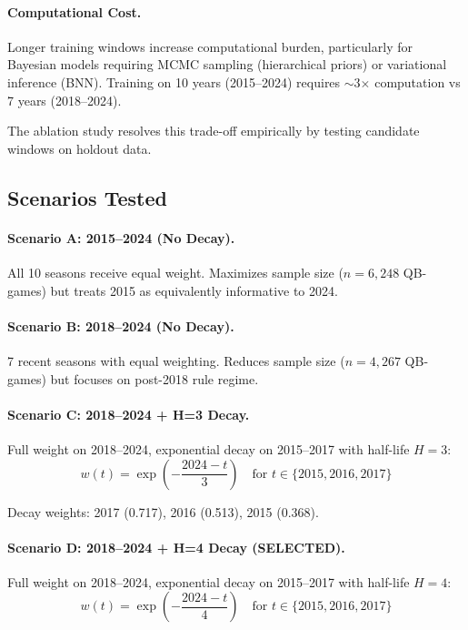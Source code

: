 \paragraph{Computational Cost.}
Longer training windows increase computational burden, particularly for Bayesian models requiring MCMC sampling (hierarchical priors) or variational inference (BNN). Training on 10 years (2015--2024) requires $\sim$3$\times$ computation vs 7 years (2018--2024).

The ablation study resolves this trade-off empirically by testing candidate windows on holdout data.

\subsection{Scenarios Tested}

\paragraph{Scenario A: 2015--2024 (No Decay).}
All 10 seasons receive equal weight. Maximizes sample size ($n=6{,}248$ QB-games) but treats 2015 as equivalently informative to 2024.

\paragraph{Scenario B: 2018--2024 (No Decay).}
7 recent seasons with equal weighting. Reduces sample size ($n=4{,}267$ QB-games) but focuses on post-2018 rule regime.

\paragraph{Scenario C: 2018--2024 + H=3 Decay.}
Full weight on 2018--2024, exponential decay on 2015--2017 with half-life $H=3$:
\begin{equation}
  w(t) = \exp\left(-\frac{2024 - t}{3}\right) \quad \text{for } t \in \{2015, 2016, 2017\}
\end{equation}

Decay weights: 2017 (0.717), 2016 (0.513), 2015 (0.368).

\paragraph{Scenario D: 2018--2024 + H=4 Decay (SELECTED).}
Full weight on 2018--2024, exponential decay on 2015--2017 with half-life $H=4$:
\begin{equation}
  w(t) = \exp\left(-\frac{2024 - t}{4}\right) \quad \text{for } t \in \{2015, 2016, 2017\}
\end{equation}

